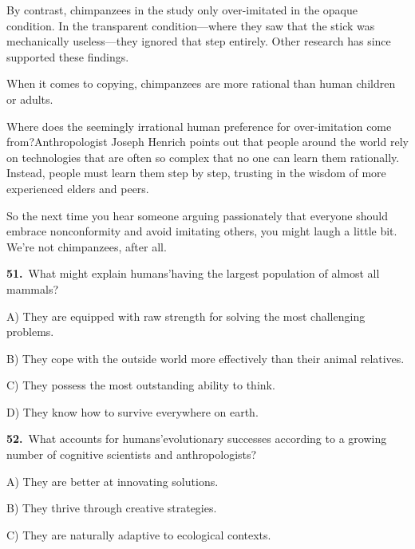 \smallskip
\noindent By contrast, chimpanzees in the study only over-imitated in the opaque condition. In the transparent condition---where they saw that the stick was mechanically useless---they ignored that step entirely. Other research has since supported these findings.\par
\smallskip
\noindent When it comes to copying, chimpanzees are more rational than human children or adults.\par
\smallskip
\noindent Where does the seemingly irrational human preference for over-imitation come from?Anthropologist Joseph Henrich points out that people around the world rely on technologies that are often so complex that no one can learn them rationally. Instead, people must learn them step by step, trusting in the wisdom of more experienced elders and peers.\par
\smallskip
\noindent So the next time you hear someone arguing passionately that everyone should embrace nonconformity and avoid imitating others, you might laugh a little bit. We're not chimpanzees, after all.\par
\smallskip
\medskip
\noindent\textbf{51.}\ What might explain humans'having the largest population of almost all mammals?\par
\noindent\hspace{1.6em}A) They are equipped with raw strength for solving the most challenging problems.\par
\noindent\hspace{1.6em}B) They cope with the outside world more effectively than their animal relatives.\par
\noindent\hspace{1.6em}C) They possess the most outstanding ability to think.\par
\noindent\hspace{1.6em}D) They know how to survive everywhere on earth.\par
\smallskip
\noindent\textbf{52.}\ What accounts for humans'evolutionary successes according to a growing number of cognitive scientists and anthropologists?\par
\noindent\hspace{1.6em}A) They are better at innovating solutions.\par
\noindent\hspace{1.6em}B) They thrive through creative strategies.\par
\noindent\hspace{1.6em}C) They are naturally adaptive to ecological contexts.\par

